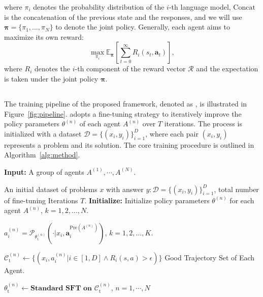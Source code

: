 where $\pi_i$ denotes the probability distribution of the $i$-th language model, $\text{Concat}$ is the concatenation of the previous state and the responses, and we will use $\mathbf{\pi} = \{\pi_1, \ldots, \pi_N\}$ to denote the joint policy. Generally, each agent aims to maximize its own reward:
\begin{equation}
    \max_{\pi_i} \mathbb{E}_{\mathbf{\pi}}\left[\sum_{t=0}^{\infty}  R_i(s_t, \mathbf{a}_t)\right],
\end{equation}
where $R_i$ denotes the $i$-th component of the reward vector $\mathcal{R}$ and the expectation is taken under the joint policy $\mathbf{\pi}$. 

\subsection{\model}
The training pipeline of the proposed framework, denoted as \model, is illustrated in Figure~\ref{fig:pipeline}. \model{} adopts a fine-tuning strategy to iteratively improve the policy parameters $\theta^{(n)}$ of each agent $A^{(n)}$ over $T$ iterations. The process is initialized with a dataset $\mathcal{D} = \{(x_i, y_i)\}_{i=1}^D$, where each pair $(x_i, y_i)$ represents a problem and its solution.
The core training procedure is outlined in Algorithm~\ref{alg:method}. 
\begin{algorithm}[htbp]
\caption{\model}
\label{alg:method}
\begin{algorithmic}[1]
\STATE \textbf{Input:} A group of agents $A^{(1)},\cdots,A^{(N)}$.

An initial dataset of problems $x$ with answer $y:\mathcal{D} = \{(x_i, y_i)\}_{i=1}^D$, total number of fine-tuning Iterations $T$.
\STATE \textbf{Initialize:} Initialize policy parameters $\theta^{(n)}$ for each agent $A^{(n)}$, $k = 1, 2, \dots, N$.

   
     \STATE {} {$a_i^{(n)}=\mathcal{P}_{\theta^{(n)}_{\text{t}}}(\cdot|x_i,\textbf{a}_i^{\mathrm{Pre}(A^{(n)})})$, $k = 1, 2, \dots, K$.}
        
            
        
            \STATE  \setlength{\fboxrule}{1.2pt} {$\mathcal{C}_{\text{t}}^{(n)}\leftarrow \{(x_i, a_i^{(n)}| i \in [1,D] \land R_i(s,a)>\epsilon)\}$} Good Trajectory Set of Each Agent.
            \STATE {} 
        \ENDFOR
        

    \STATE  {} {$\theta^{(n)}_{\text{t}} \leftarrow \textbf{Standard SFT on }\mathcal{C}_{\text{t}}^{(n)}$, $n=1,\cdots,N$}
\ENDFOR
\end{algorithmic}
\end{algorithm}

